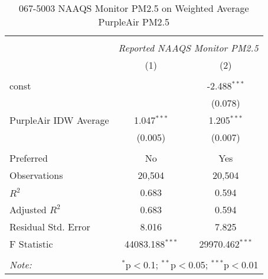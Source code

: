 \begin{table}[!htbp] \centering
  \caption{067-5003 NAAQS Monitor PM2.5 on Weighted Average PurpleAir PM2.5}
  \label{tab:reg_067-5003}
\begin{tabular}{@{\extracolsep{5pt}}lcc}
\\[-1.8ex]\hline
\hline \\[-1.8ex]
& \multicolumn{2}{c}{\textit{Reported NAAQS Monitor PM2.5}} \
\cr \cline{2-3}
\\[-1.8ex] & (1) & (2) \\
\hline \\[-1.8ex]
 const & & -2.488$^{***}$ \\
  & & (0.078) \\
 PurpleAir IDW Average & 1.047$^{***}$ & 1.205$^{***}$ \\
  & (0.005) & (0.007) \\
\hline \\[-1.8ex]
 Preferred & No & Yes \\
 Observations & 20,504 & 20,504 \\
 $R^2$ & 0.683 & 0.594 \\
 Adjusted $R^2$ & 0.683 & 0.594 \\
 Residual Std. Error & 8.016 & 7.825  \\
 F Statistic & 44083.188$^{***}$  & 29970.462$^{***}$  \\
\hline
\hline \\[-1.8ex]
\textit{Note:} & \multicolumn{2}{r}{$^{*}$p$<$0.1; $^{**}$p$<$0.05; $^{***}$p$<$0.01} \\
\end{tabular}
\end{table}